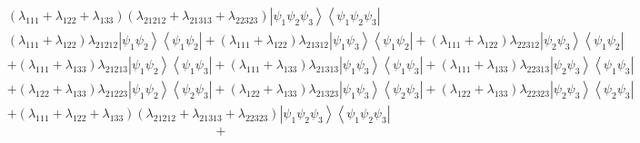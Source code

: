 \documentclass[aps,preprint]{revtex4}%
\begin{document}
\begin{align}
& \left(  \lambda_{111}+\lambda_{122}+\lambda_{133}\right)  \left(
\lambda_{21212}+\lambda_{21313}+\lambda_{22323}\right)  \left\vert \psi
_{1}\psi_{2}\psi_{3}\right\rangle \left\langle \psi_{1}\psi_{2}\psi
_{3}\right\vert \nonumber\\
& \left(  \lambda_{111}+\lambda_{122}\right)  \lambda_{21212}\left\vert
\psi_{1}\psi_{2}\right\rangle \left\langle \psi_{1}\psi_{2}\right\vert
+\left(  \lambda_{111}+\lambda_{122}\right)  \lambda_{21312}\left\vert
\psi_{1}\psi_{3}\right\rangle \left\langle \psi_{1}\psi_{2}\right\vert
+\left(  \lambda_{111}+\lambda_{122}\right)  \lambda_{22312}\left\vert
\psi_{2}\psi_{3}\right\rangle \left\langle \psi_{1}\psi_{2}\right\vert
\nonumber\\
& +\left(  \lambda_{111}+\lambda_{133}\right)  \lambda_{21213}\left\vert
\psi_{1}\psi_{2}\right\rangle \left\langle \psi_{1}\psi_{3}\right\vert
+\left(  \lambda_{111}+\lambda_{133}\right)  \lambda_{21313}\left\vert
\psi_{1}\psi_{3}\right\rangle \left\langle \psi_{1}\psi_{3}\right\vert
+\left(  \lambda_{111}+\lambda_{133}\right)  \lambda_{22313}\left\vert
\psi_{2}\psi_{3}\right\rangle \left\langle \psi_{1}\psi_{3}\right\vert
\nonumber\\
& +\left(  \lambda_{122}+\lambda_{133}\right)  \lambda_{21223}\left\vert
\psi_{1}\psi_{2}\right\rangle \left\langle \psi_{2}\psi_{3}\right\vert
+\left(  \lambda_{122}+\lambda_{133}\right)  \lambda_{21323}\left\vert
\psi_{1}\psi_{3}\right\rangle \left\langle \psi_{2}\psi_{3}\right\vert
+\left(  \lambda_{122}+\lambda_{133}\right)  \lambda_{22323}\left\vert
\psi_{2}\psi_{3}\right\rangle \left\langle \psi_{2}\psi_{3}\right\vert
\nonumber\\
& +\left(  \lambda_{111}+\lambda_{122}+\lambda_{133}\right)  \left(
\lambda_{21212}+\lambda_{21313}+\lambda_{22323}\right)  \left\vert \psi
_{1}\psi_{2}\psi_{3}\right\rangle \left\langle \psi_{1}\psi_{2}\psi
_{3}\right\vert
\end{align}%
\[
+
\]%
\end{document}
